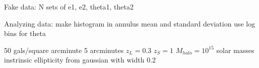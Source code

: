 \documentclass[]{article}
\begin{document}
Fake data:
N sets of e1, e2, theta1, theta2

Analyzing data:
make histogram in annulus
mean and standard deviation
use log bins for theta


50 gals/square arcminute
5 arcminutes
$z_L = 0.3$
$z_S = 1$
$M_{halo} = 10^15$ solar masses
instrinsic ellipticity from gaussian with width 0.2
\end{document}
